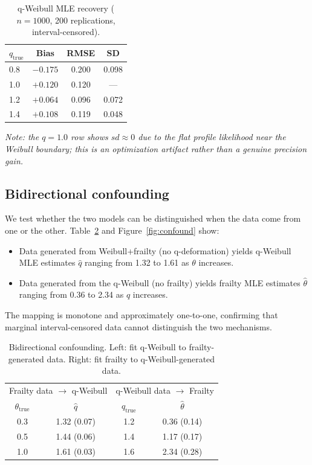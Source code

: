 \documentclass[12pt,a4paper]{article}
\begin{document}
\begin{table}[ht]
\centering
\caption{q-Weibull MLE recovery ($n=1000$, 200 replications, interval-censored).}
\begin{tabular}{lccc}
\toprule
$q_{\text{true}}$ & Bias & RMSE & SD \\
\midrule
0.8 & $-0.175$ & 0.200 & 0.098 \\
1.0 & $+0.120$ & 0.120 & --- \\
1.2 & $+0.064$ & 0.096 & 0.072 \\
1.4 & $+0.108$ & 0.119 & 0.048 \\
\bottomrule
\end{tabular}
\label{tab:recovery}
\end{table}
\noindent\small\textit{Note: the $q=1.0$ row shows $sd\approx0$ due to the flat profile likelihood near the Weibull boundary; this is an optimization artifact rather than a genuine precision gain.}

\subsection{Bidirectional confounding}

We test whether the two models can be distinguished when the data come from one or the other. Table~\ref{tab:confound} and Figure~\ref{fig:confound} show:
\begin{itemize}
\item Data generated from Weibull+frailty (no q-deformation) yields q-Weibull MLE estimates $\hat q$ ranging from 1.32 to 1.61 as $\theta$ increases.
\item Data generated from the q-Weibull (no frailty) yields frailty MLE estimates $\hat\theta$ ranging from 0.36 to 2.34 as $q$ increases.
\end{itemize}
The mapping is monotone and approximately one-to-one, confirming that marginal interval-censored data cannot distinguish the two mechanisms.

\begin{table}[ht]
\centering
\caption{Bidirectional confounding. Left: fit q-Weibull to frailty-generated data. Right: fit frailty to q-Weibull-generated data.}
\begin{tabular}{cc|cc}
\toprule
\multicolumn{2}{c|}{Frailty data $\to$ q-Weibull} & \multicolumn{2}{c}{q-Weibull data $\to$ Frailty} \\
$\theta_{\text{true}}$ & $\hat q$ & $q_{\text{true}}$ & $\hat\theta$ \\
\midrule
0.3 & 1.32 (0.07) & 1.2 & 0.36 (0.14) \\
0.5 & 1.44 (0.06) & 1.4 & 1.17 (0.17) \\
1.0 & 1.61 (0.03) & 1.6 & 2.34 (0.28) \\
\bottomrule
\end{tabular}
\label{tab:confound}
\end{table}
\end{document}
